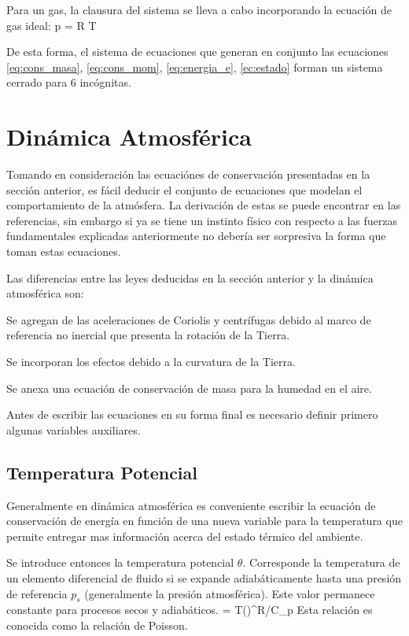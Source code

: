 Para un gas, la clausura del sistema se lleva a cabo incorporando la ecuación de gas ideal:
\be \label{eq:gas_ideal}
p = \rho R T
\ee

De esta forma, el sistema de ecuaciones que generan en conjunto las ecuaciones \ref{eq:cons_masa}, \ref{eq:cons_mom}, \ref{eq:energia_e}, \ref{ec:estado} forman un sistema cerrado para 6 incógnitas.
\section{Dinámica Atmosférica}
Tomando en consideración las ecuaciónes de conservación presentadas en la sección anterior, es fácil deducir el conjunto de ecuaciones que modelan el comportamiento de la atmósfera. La derivación de estas se puede encontrar en las referencias, sin embargo si ya se tiene un instinto físico con respecto a las fuerzas fundamentales explicadas anteriormente no debería ser sorpresiva la forma que toman estas ecuaciones. 

Las diferencias entre las leyes deducidas en la sección anterior y la dinámica atmosférica son:
\begin{enumerate*}
	\item Se agregan de las aceleraciones de Coriolis y centrífugas debido al marco de referencia no inercial que presenta la rotación de la Tierra.
	\item Se incorporan los efectos debido a la curvatura de la Tierra.
	\item Se anexa una ecuación de conservación de masa para la humedad en el aire.
\end{enumerate*} 
Antes de escribir las ecuaciones en su forma final es necesario definir primero algunas variables auxiliares.
\subsection{Temperatura Potencial}
Generalmente en dinámica atmosférica es conveniente escribir la ecuación de conservación de energía en función de una nueva variable para la temperatura que permite entregar mas información acerca del estado térmico del ambiente. 

Se introduce entonces la temperatura potencial $\theta$. Corresponde la temperatura de un elemento diferencial de fluido si se expande adiabáticamente hasta una presión de referencia $p_s$ (generalmente la presión atmosférica). Este valor permanece constante para procesos secos y adiabáticos.
\be \label{eq:temp_pot}
\theta = T\left(\right)^{R/C_p}
\ee 
Esta relación es conocida como la relación de Poisson.
